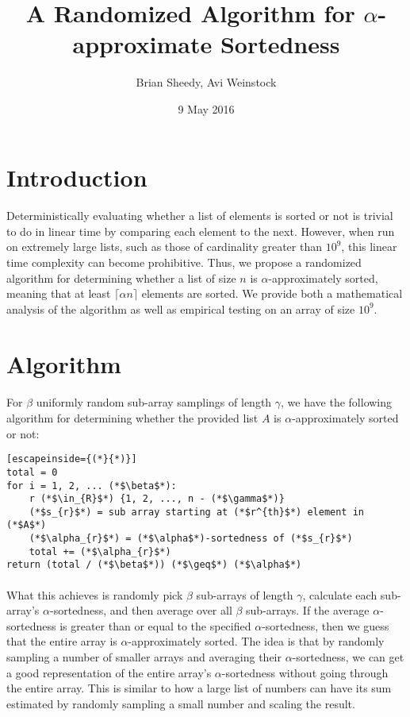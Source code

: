 \documentclass{article}
\title{A Randomized Algorithm for $\alpha$-approximate Sortedness}
\date{9 May 2016}
\author{Brian Sheedy, Avi Weinstock}
\begin{document}
\maketitle{}
\section{Introduction}
\paragraph{}Deterministically evaluating whether a list of elements is sorted or not is trivial to do in linear time by comparing each element to the next.
However, when run on extremely large lists, such as those of cardinality greater than $10^9$, this linear time complexity can become prohibitive.
Thus, we propose a randomized algorithm for determining whether a list of size $n$ is $\alpha$-approximately sorted, meaning that at least $\lceil\alpha n\rceil$ elements are sorted.
We provide both a mathematical analysis of the algorithm as well as empirical testing on an array of size $10^9$.
\section{Algorithm}
\paragraph{}For $\beta$ uniformly random sub-array samplings of length $\gamma$, we have the following algorithm for determining whether the provided list $A$ is $\alpha$-approximately sorted or not:
\begin{lstlisting}[escapeinside={(*}{*)}]
total = 0
for i = 1, 2, ... (*$\beta$*):
    r (*$\in_{R}$*) {1, 2, ..., n - (*$\gamma$*)}
    (*$s_{r}$*) = sub array starting at (*$r^{th}$*) element in (*$A$*)
    (*$\alpha_{r}$*) = (*$\alpha$*)-sortedness of (*$s_{r}$*)
    total += (*$\alpha_{r}$*)
return (total / (*$\beta$*)) (*$\geq$*) (*$\alpha$*)
\end{lstlisting}
\paragraph{}What this achieves is randomly pick $\beta$ sub-arrays of length $\gamma$, calculate each sub-array's $\alpha$-sortedness, and then average over all $\beta$ sub-arrays.
 If the average $\alpha$-sortedness is greater than or equal to the specified $\alpha$-sortedness, then we guess that the entire array is $\alpha$-approximately sorted.
The idea is that by randomly sampling a number of smaller arrays and averaging their $\alpha$-sortedness, we can get a good representation of the entire array's $\alpha$-sortedness without going through the entire array.
 This is similar to how a large list of numbers can have its sum estimated by randomly sampling a small number and scaling the result.
\end{document}
